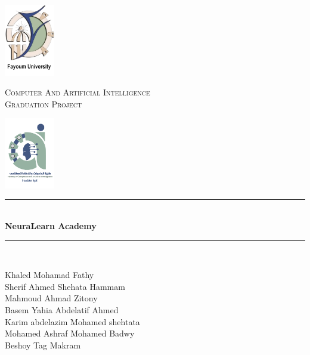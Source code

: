 \begin{titlepage} 
	\newcommand{\HRule}{\rule{\linewidth}{0.5mm}} %
	
	\begin{center}
		\begin{minipage}{0.15\textwidth}%
			\includegraphics[width=2.2cm]{content/Logo copy.png}
		\end{minipage}
		\begin{minipage}{0.69\textwidth}%
			\center
			\textsc{\large  Computer And Artificial Intelligence}\\[0.5cm]
			\textsc{\normalsize Graduation Project}\\[0.5cm]
		\end{minipage}\hfill
		\begin{minipage}{0.15\textwidth}%
			\includegraphics[width=2.2cm]{content/faculty.png}
        \end{minipage}
	\end{center}

	\center %
	
	\vspace{3cm}
	\HRule\\[0.4cm]
	
	{\huge\bfseries NeuraLearn Academy}\\[0.4cm] %
	
	\HRule\\[1.5cm]
	
	\begin{spacing}{1}
		\begin{center}
			\large
			Khaled Mohamad Fathy \\
			Sherif Ahmed Shehata Hammam \\
			Mahmoud Ahmad Zitony \\
			Basem Yahia Abdelatif Ahmed \\ 
			Karim abdelazim Mohamed shehtata \\
			Mohamed Ashraf Mohamed Badwy \\ 
			Beshoy Tag Makram \\
			\vspace{50mm}
		\end{center}
	\end{spacing}


\end{titlepage}
